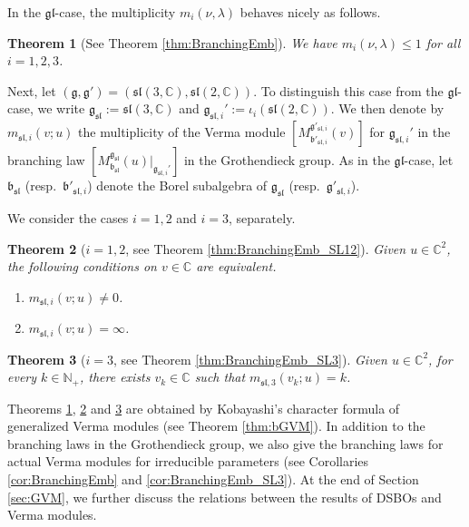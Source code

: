 \documentclass[a4paper,11pt,reqno]{amsart}
\newcommand{\frakg}{\mathfrak{g}}
\newcommand{\0}{{\bf 0}}
\newcommand{\N}{\mathbb{N}}
\newcommand{\C}{\mathbb{C}}
\newcommand{\1}{{\bf 1}}
\newcommand{\frakb}{{\mathfrak b}}
\newcommand{\fraksl}{{\mathfrak{sl}}}
\newcommand{\Mbsl}{M^{\frakg_{\fraksl}}_{\frakb_{\fraksl}}}
\theoremstyle{plain}
\newtheorem{thmalph}{Theorem}
\theoremstyle{definition}
\numberwithin{equation}{section}
\theoremstyle{definition}
\begin{document}
In the $\mathfrak{gl}$-case, the multiplicity $m_i(\nu,\lambda)$ behaves nicely as follows.

\begin{thmalph}
[{See Theorem \ref{thm:BranchingEmb}}]
\label{Intro:K}
We have $m_i(\nu,\lambda) \leq 1$ for all $i=1,2,3$.
\end{thmalph}

Next, let $(\frakg,\frakg')=(\mathfrak{sl}(3,\C), \mathfrak{sl}(2,\C))$.
To distinguish this case from the $\mathfrak{gl}$-case, we write
$\frakg_{\fraksl} := \mathfrak{sl}(3,\C)$ and $\frakg_{\fraksl,i}':=\iota_i(\mathfrak{sl}(2,\C))$.
We then denote by
$m_{\fraksl,i}(v;u)$ the multiplicity of the Verma module
$[M^{\frakg'_{\fraksl,i}}_{\frakb'_{\fraksl,i}}(v)]$ for $\frakg_{\fraksl,i}'$ 
in the branching law $[\Mbsl(u)\vert_{\frakg_{\fraksl,i}'}]$ in the Grothendieck group.
As in the $\mathfrak{gl}$-case, let  $\frakb_{\fraksl}$ (resp.\ $\frakb'_{\fraksl,i}$) denote
the Borel subalgebra of $\frakg_{\fraksl}$ (resp.\ $\frakg'_{\fraksl,i}$).

We consider the cases $i=1,2$ and $i=3$, separately.

\begin{thmalph}
[{$i=1,2$, see Theorem \ref{thm:BranchingEmb_SL12}}]
\label{Intro:L}
Given $u \in \C^2$, the following conditions on $v \in \C$ are equivalent.
\begin{enumerate}[label=\normalfont{(\roman*)}]
\item $m_{\fraksl,i}(v;u)\neq 0$.
\item $m_{\fraksl,i}(v;u)=\infty$.
\end{enumerate}
\end{thmalph}

\begin{thmalph}
[{$i=3$, see Theorem \ref{thm:BranchingEmb_SL3}}]
\label{Intro:M}
Given $u \in \C^2$, for every $k \in \N_+$, there exists $v_k \in \C$ such that
$m_{\fraksl,3}(v_k;u)=k$.
\end{thmalph}

Theorems \ref{Intro:K}, \ref{Intro:L} and \ref{Intro:M} are obtained by
Kobayashi's character formula of generalized Verma modules
(see Theorem \ref{thm:bGVM}).
In addition to the branching laws in the Grothendieck group,
we also give the branching laws for actual Verma modules 
for irreducible parameters (see Corollaries \ref{cor:BranchingEmb} and
\ref{cor:BranchingEmb_SL3}).
At the end of Section \ref{sec:GVM}, we further discuss the relations between
the results of DSBOs and Verma modules.
\end{document}
